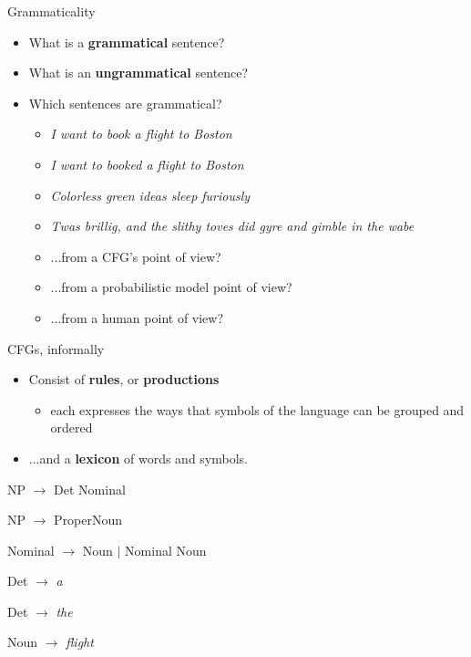 \documentclass{beamer}
\begin{document}
\begin{frame}{Grammaticality}

  \begin{itemize}
  \item What is a {\bf grammatical} sentence?
  \item What is an {\bf ungrammatical} sentence?
  \item Which sentences are grammatical?
    \begin{itemize}
    \item {\it I want to book a flight to Boston}
    \item {\it I want to booked a flight to Boston}
    \item {\it Colorless green ideas sleep furiously}
    \item {\it Twas brillig, and the slithy toves did gyre and gimble in the wabe}
    \end{itemize}
    \begin{itemize}
    \item ...from a CFG's point of view?
    \item ...from a probabilistic model point of view?
    \item ...from a human point of view?
    \end{itemize}
  \end{itemize}
\end{frame}

\begin{frame}{CFGs, informally}
  \begin{itemize}
  \item Consist of {\bf rules}, or {\bf productions}
    \begin{itemize}
    \item each expresses the ways that symbols of the language can be grouped and ordered 
    \end{itemize}
  \item ...and a {\bf lexicon} of words and symbols.
  \end{itemize}
  
NP $\rightarrow$ Det Nominal

NP  $\rightarrow$  ProperNoun

Nominal  $\rightarrow$  Noun $\vert$ Nominal Noun

Det $\rightarrow$ {\it a}

Det $\rightarrow$ {\it the}

Noun $\rightarrow$ {\it flight}
\end{frame}
\end{document}
